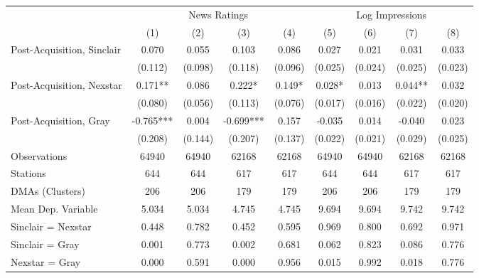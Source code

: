 {
\def\sym#1{\ifmmode^{#1}\else\(^{#1}\)\fi}
\begin{tabular}{l*{8}{c}}
\toprule
                &\multicolumn{4}{c}{News Ratings}                   &\multicolumn{4}{c}{Log Impressions}                \\\cmidrule(lr){2-5}\cmidrule(lr){6-9}
                &\multicolumn{1}{c}{(1)}   &\multicolumn{1}{c}{(2)}   &\multicolumn{1}{c}{(3)}   &\multicolumn{1}{c}{(4)}   &\multicolumn{1}{c}{(5)}   &\multicolumn{1}{c}{(6)}   &\multicolumn{1}{c}{(7)}   &\multicolumn{1}{c}{(8)}   \\
\midrule
Post-Acquisition, Sinclair&    0.070   &    0.055   &    0.103   &    0.086   &    0.027   &    0.021   &    0.031   &    0.033   \\
                &  (0.112)   &  (0.098)   &  (0.118)   &  (0.096)   &  (0.025)   &  (0.024)   &  (0.025)   &  (0.023)   \\
Post-Acquisition, Nexstar&    0.171** &    0.086   &    0.222*  &    0.149*  &    0.028*  &    0.013   &    0.044** &    0.032   \\
                &  (0.080)   &  (0.056)   &  (0.113)   &  (0.076)   &  (0.017)   &  (0.016)   &  (0.022)   &  (0.020)   \\
Post-Acquisition, Gray&   -0.765***&    0.004   &   -0.699***&    0.157   &   -0.035   &    0.014   &   -0.040   &    0.023   \\
                &  (0.208)   &  (0.144)   &  (0.207)   &  (0.137)   &  (0.022)   &  (0.021)   &  (0.029)   &  (0.025)   \\
\midrule
Observations    &    64940   &    64940   &    62168   &    62168   &    64940   &    64940   &    62168   &    62168   \\
Stations        &      644   &      644   &      617   &      617   &      644   &      644   &      617   &      617   \\
DMAs (Clusters) &      206   &      206   &      179   &      179   &      206   &      206   &      179   &      179   \\
Mean Dep. Variable&    5.034   &    5.034   &    4.745   &    4.745   &    9.694   &    9.694   &    9.742   &    9.742   \\
\midrule Sinclair = Nexstar&    0.448   &    0.782   &    0.452   &    0.595   &    0.969   &    0.800   &    0.692   &    0.971   \\
Sinclair = Gray &    0.001   &    0.773   &    0.002   &    0.681   &    0.062   &    0.823   &    0.086   &    0.776   \\
Nexstar = Gray  &    0.000   &    0.591   &    0.000   &    0.956   &    0.015   &    0.992   &    0.018   &    0.776   \\
\bottomrule
\end{tabular}
}
